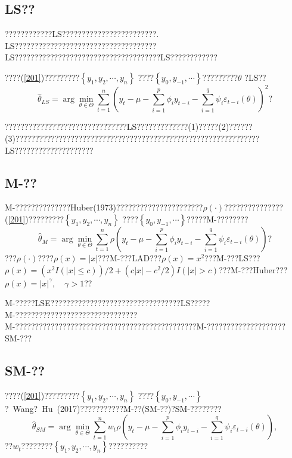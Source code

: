 \documentclass[a4paper,12pt,openany,oneside,utf-8]{ctexbook}
\begin{document}
	\subsection{LS??}
	
	????????????LS????????????????????????. LS????????????????????????????????????LS?????????????????????????????????????LS????????????
	
	????(\ref{201})?????????$\left\{y_1,y_2,\cdots,y_n\right\}$ ????$\left\{y_0,y_{-1},\cdots\right\}$?????????$\theta$ ?LS??
	$$
	\hat{\theta}_{LS}=\arg\min_{\theta\in\Theta}\sum_{t=1}^n\left(y_t-\mu-\sum_{i=1}^p\phi_iy_{t-i}-\sum_{i=1}^q\psi_i\varepsilon_{t-i}(\theta)\right)^2\mbox{?}
	$$
	
	
	???????????????????????????????LS?????????????(1)?????(2)??????(3)??????????????????????????????????????????????????????????????LS????????????????????
	
	\subsection{M-??}
	
	M-??????????????Huber(1973)??????????????????????$\rho(\cdot)$???????????????(\ref{201})?????????$\left\{y_1,y_2,\cdots,y_n\right\}$ ????$\left\{y_0,y_{-1},\cdots\right\}$?????M-????????
	$$
	\hat{\theta}_{M}=\arg\min_{\theta\in\Theta}\sum_{t=1}^{n}\rho\left(y_t-\mu-\sum_{i=1}^p\phi_iy_{t-i}-\sum_{i=1}^q\psi_i\varepsilon_{t-i}(\theta)\right)\mbox{?}
	$$
	???$\rho(\cdot)$????$\rho(x)=|x|$???M-???LAD???$\rho(x)=x^2$???M-???LS???$\rho(x)=\left(x^{2} I(|x| \leq c)\right) / 2+\left(c|x|-c^{2} / 2\right) I(|x|>c)$???M-???Huber???$\rho(x)=|x|^\gamma,\quad \gamma>1$??
	
	M-?????LSE?????????????????????????????????LS?????M-???????????????????????????????M-??????????????????????????????????????????????M-????????????????????SM-???
	
	\subsection{SM-??}
	
	????(\ref{201})?????????$\left\{y_1,y_2,\cdots,y_n\right\}$ ????$\left\{y_0,y_{-1},\cdots\right\}$?~Wang?~Hu~(2017)???????????M-??(SM-??)?SM-????????
	$$
	\hat{\theta}_{SM}=\arg\min_{\theta\in\Theta}\sum_{t=1}^{n}w_t\rho\left(y_t-\mu-\sum_{i=1}^p\phi_iy_{t-i}-\sum_{i=1}^q\psi_i\varepsilon_{t-i}(\theta)\right),
	$$
	??$w_t$????????$\left\{y_1,y_2,\cdots,y_n\right\}$??????????
	
\end{document}
